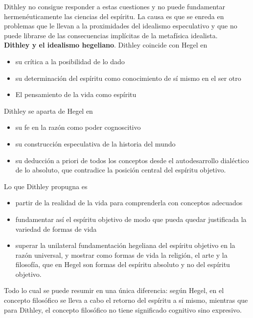 \documentclass[a4paper, 11pt, twocolumn, spanish]{article}
\begin{document}
Dithley no consigue responder a estas cuestiones y no puede
fundamentar hermenéuticamente las ciencias del espíritu. La causa es
que se enreda en problemas que le llevan a la proximidades del
idealismo especulativo y que no puede librarse de las consecuencias
implícitas de la metafísica idealista.\\[0pt]

\textbf{Dithley y el idealismo hegeliano}. Dithley coincide con Hegel en
\begin{itemize}
\item su crítica a la posibilidad de lo dado
\item su determinación del espíritu como conocimiento de sí mismo en el
ser otro
\item El pensamiento de la vida como espíritu
\end{itemize}

Dithley se aparta de Hegel en
\begin{itemize}
\item su fe en la razón como poder cognoscitivo
\item su construcción especulativa de la historia del mundo
\item su deducción a priori de todos los conceptos desde el
autodesarrollo dialéctico de lo absoluto, que contradice la
posición central del espíritu objetivo.
\end{itemize}

Lo que Dithley propugna es
\begin{itemize}
\item partir de la realidad de la vida para comprenderla con conceptos
adecuados
\item fundamentar así el espíritu objetivo de modo que pueda quedar
justificada la variedad de formas de vida
\item superar la unilateral fundamentación hegeliana del espíritu
objetivo en la razón universal, y mostrar como formas de vida la
religión, el arte y la filosofía, que en Hegel son formas del
espíritu absoluto y no del espíritu objetivo.
\end{itemize}

Todo lo cual se puede resumir en una única diferencia: según Hegel, en
el concepto filosófico se lleva a cabo el retorno del espíritu a sí
mismo, mientras que para Dithley, el concepto filosófico no tiene
significado cognitivo sino expresivo.\\[0pt]
\end{document}
